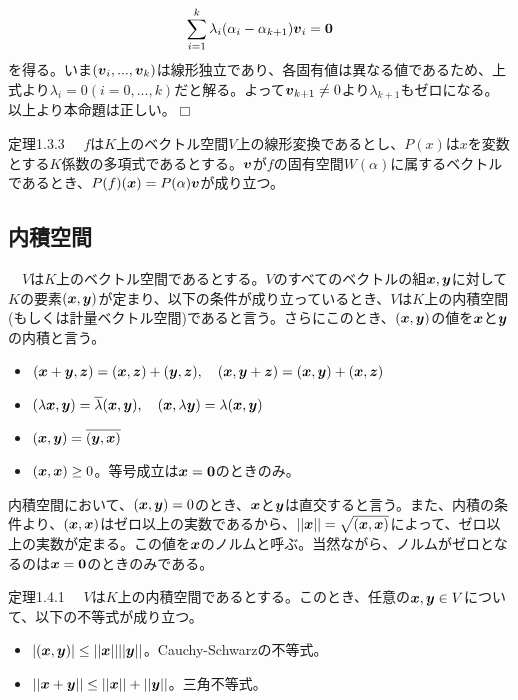 \documentclass[dvipdfmx, 9pt, a4paper]{jsarticle}
\numberwithin{equation}{subsection}
\newcommand{\bm}[1]{{\mbox{\boldmath $#1$}}}
\def\qed{\hfill $\Box$}
\begin{document}
\begin{equation}
\sum_{i=1}^k\lambda_i(\alpha_i-\alpha_{k+1})\bm v_i=\bm 0 \notag
\end{equation}
を得る。いま$(\bm v_i, ..., \bm v_k)$は線形独立であり、各固有値は異なる値であるため、上式より$\lambda_i=0(i=0, ..., k)$だと解る。よって$\bm v_{k+1} \neq 0$より$\lambda_{k+1}$もゼロになる。以上より本命題は正しい。\qed
\begin{itembox}[l]{定理1.3.3}
　$f$は$K$上のベクトル空間$V$上の線形変換であるとし、$P(x)$は$x$を変数とする$K$係数の多項式であるとする。$\bm v$が$f$の固有空間$W(\alpha)$に属するベクトルであるとき、$P(f)(\bm x)=P(\alpha)\bm v$が成り立つ。
\end{itembox}

\subsection{内積空間}
\begin{tcolorbox}[title=内積空間]
　$V$は$K$上のベクトル空間であるとする。$V$のすべてのベクトルの組$\bm x, \bm y$に対して$K$の要素$(\bm x, \bm y)$が定まり、以下の条件が成り立っているとき、$V$は$K$上の内積空間(もしくは計量ベクトル空間)であると言う。さらにこのとき、$(\bm x, \bm y)$の値を$\bm x$と$\bm y$の内積と言う。
\begin{itemize}
\item $(\bm x+\bm y, \bm z)=(\bm x, \bm z)+(\bm y, \bm z),~~~(\bm x, \bm y+\bm z)=(\bm x, \bm y)+(\bm x, \bm z)$
\item $(\lambda\bm x, \bm y)=\overline{\lambda}(\bm x, \bm y),~~~(\bm x, \lambda\bm y)=\lambda(\bm x, \bm y)$
\item $(\bm x, \bm y)=\overline{(\bm y, \bm x)}$
\item $(\bm x, \bm x) \geq 0$。等号成立は$\bm x=\bm 0$のときのみ。
\end{itemize}
\end{tcolorbox}
内積空間において、$(\bm x, \bm y)=0$のとき、$\bm x$と$\bm y$は直交すると言う。また、内積の条件より、$(\bm x, \bm x)$はゼロ以上の実数であるから、$|| \bm x ||=\sqrt{(\bm x, \bm x)}$によって、ゼロ以上の実数が定まる。この値を$\bm x$のノルムと呼ぶ。当然ながら、ノルムがゼロとなるのは$\bm x=\bm 0$のときのみである。
\begin{itembox}[l]{定理1.4.1}
　$V$は$K$上の内積空間であるとする。このとき、任意の$\bm x, \bm y \in V$について、以下の不等式が成り立つ。
\begin{itemize}
\item $|(\bm x, \bm y)| \leq ||\bm x||||\bm y||$。Cauchy-Schwarzの不等式。
\item $||\bm x+\bm y|| \leq ||\bm x|| + ||\bm y||$。三角不等式。
\end{itemize}
\end{itembox}
\end{document}

